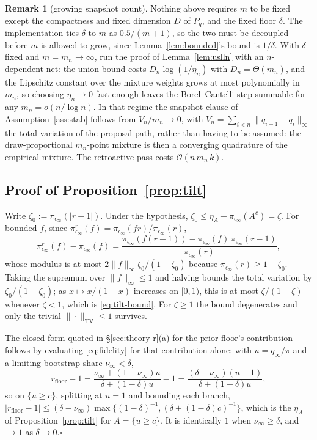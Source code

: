 \documentclass[pdflatex,sn-mathphys-num]{sn-jnl}
\theoremstyle{plain}
\theoremstyle{definition}
\newtheorem{remark}{Remark}
\begin{document}
\begin{appendices}
\begin{remark}[growing snapshot count]\label{rem:growing-m}
Nothing above requires $m$ to be fixed except the compactness and fixed dimension $D$ of $P_q$, and the fixed floor $\delta$. The implementation ties $\delta$ to $m$ as $0.5/(m{+}1)$, so the two must be decoupled before $m$ is allowed to grow, since Lemma~\ref{lem:bounded}'s bound is $1/\delta$. With $\delta$ fixed and $m=m_n\to\infty$, run the proof of Lemma~\ref{lem:uslln} with an $n$-dependent net: the union bound costs $D_n\log(1/\eta_n)$ with $D_n=\Theta(m_n)$, and the Lipschitz constant over the mixture weights grows at most polynomially in $m_n$, so choosing $\eta_n\to0$ fast enough leaves the Borel--Cantelli step summable for any $m_n=o(n/\log n)$. In that regime the snapshot clause of Assumption~\ref{ass:stab} follows from $V_n/m_n\to0$, with $V_n=\sum_{i<n}\|q_{i+1}-q_i\|_\infty$ the total variation of the proposal path, rather than having to be assumed: the draw-proportional $m_n$-point mixture is then a converging quadrature of the empirical mixture. The retroactive pass costs $\mathcal{O}(n\,m_n\,k)$.
\end{remark}

\subsection{Proof of Proposition~\ref{prop:tilt}}\label{app:theory-tilt}
Write $\zeta_0:=\pi_{\epsilon_\infty}(|r-1|)$. Under the hypothesis, $\zeta_0\le\eta_A+\pi_{\epsilon_\infty}(A^c)=\zeta$. For bounded $f$, since $\pi^r_{\epsilon_\infty}(f)=\pi_{\epsilon_\infty}(fr)/\pi_{\epsilon_\infty}(r)$,
\[
\pi^r_{\epsilon_\infty}(f)-\pi_{\epsilon_\infty}(f)
=\frac{\pi_{\epsilon_\infty}\!\left(f(r-1)\right)-\pi_{\epsilon_\infty}(f)\,\pi_{\epsilon_\infty}(r-1)}{\pi_{\epsilon_\infty}(r)},
\]
whose modulus is at most $2\|f\|_\infty\zeta_0/(1-\zeta_0)$ because $\pi_{\epsilon_\infty}(r)\ge1-\zeta_0$. Taking the supremum over $\|f\|_\infty\le1$ and halving bounds the total variation by $\zeta_0/(1-\zeta_0)$; as $x\mapsto x/(1-x)$ increases on $[0,1)$, this is at most $\zeta/(1-\zeta)$ whenever $\zeta<1$, which is \eqref{eq:tilt-bound}. For $\zeta\ge1$ the bound degenerates and only the trivial $\|\cdot\|_{\mathrm{TV}}\le1$ survives.

The closed form quoted in \S\ref{sec:theory-r}(a) for the prior floor's contribution follows by evaluating \eqref{eq:fidelity} for that contribution alone: with $u=q_\infty/\pi$ and a limiting bootstrap share $\nu_\infty<\delta$,
\[
r_{\mathrm{floor}}-1=\frac{\nu_\infty+(1-\nu_\infty)u}{\delta+(1-\delta)u}-1=\frac{(\delta-\nu_\infty)(u-1)}{\delta+(1-\delta)u},
\]
so on $\{u\ge c\}$, splitting at $u=1$ and bounding each branch, $|r_{\mathrm{floor}}-1|\le(\delta-\nu_\infty)\max\{(1-\delta)^{-1},(\delta+(1-\delta)c)^{-1}\}$, which is the $\eta_A$ of Proposition~\ref{prop:tilt} for $A=\{u\ge c\}$. It is identically $1$ when $\nu_\infty\ge\delta$, and $\to1$ as $\delta\to0$.\hfill$\square$

\end{appendices}
\end{document}
